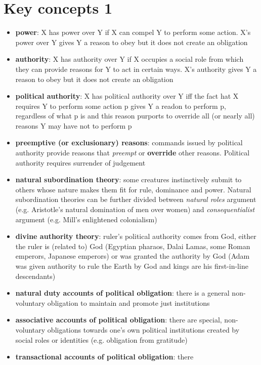 \section{Key concepts 1}

\begin{itemize}
	\item \textbf{power}: X has power over Y if X can compel Y to perform
	 some action. X's power over Y gives Y a reason to obey but it does not
	 create an obligation
	\item \textbf{authority}: X has authority over Y if X occupies a social
	 role from which they can provide reasons for Y to act in certain ways.
	 X's authority gives Y a reason to obey but it does not create an
	 obligation
	\item \textbf{political authority}: X has political authority over Y
	 iff the fact hat X requires Y to perform some action p gives Y a
	 readon to perform p, regardless of what p is and this reason purports
	 to override all (or nearly all) reasons Y may have not to perform p
	\item \textbf{preemptive (or exclusionary) reasons}: commands issued by
	 political authority provide reasons that \textit{preempt} or
	 \textbf{override} other reasons. Political authority requires
	 surrender of judgement
	\item \textbf{natural subordination theory}: some creatures
	 instinctively submit to others whose nature makes them fit for rule,
	 dominance and power. Natural subordination theories can be further
	 divided between \textit{natural roles} argument (e.g. Aristotle's
	 natural domination of men over women) and \textit{consequentialist}
	 argument (e.g. Mill's enlightened colonialism)
	\item \textbf{divine authority theory}: ruler's political authority
	 comes from God, either the ruler is (related to) God (Egyptian
	 pharaos, Dalai Lamas, some Roman emperors, Japanese emperors) or was
	 granted the authority by God (Adam was given authority to rule the
	 Earth by God and kings are his first-in-line descendants)
	\item \textbf{natural duty accounts of political obligation}: there is
	 a general non-voluntary obligation to maintain and promote just
	 institutions
	\item \textbf{associative accounts of political obligation}: there are
	 special, non-voluntary obligations towards one's own political
	 institutions created by social roles or identities (e.g. obligation
	 from gratitude)
	\item \textbf{transactional accounts of political obligation}: there

\end{itemize}
